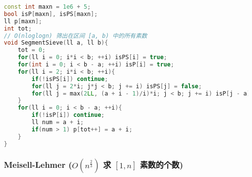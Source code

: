 \begin{lstlisting}[language=C++]
const int maxn = 1e6 + 5;
bool isP[maxn], isPS[maxn];
ll p[maxn];
int tot;
// O(nloglogn) 筛出在区间 [a, b) 中的所有素数
void SegmentSieve(ll a, ll b){
    tot = 0;
    for(ll i = 0; i*i < b; ++i) isPS[i] = true;
    for(int i = 0; i < b - a; ++i) isP[i] = true;
    for(ll i = 2; i*i < b; ++i){
        if(!isPS[i]) continue;
        for(ll j = 2*i; j*j < b; j += i) isPS[j] = false;
        for(ll j = max(2LL, (a + i - 1)/i)*i; j < b; j += i) isP[j - a] = false;
    }
    for(ll i = 0; i < b - a; ++i){
        if(!isP[i]) continue;
        ll num = a + i;
        if(num > 1) p[tot++] = a + i;
    }
}
\end{lstlisting}




\subsubsection{Meisell-Lehmer ($O(n ^ {\frac{2}{3}})$ 求 $[1,  n]$ 素数的个数)}

